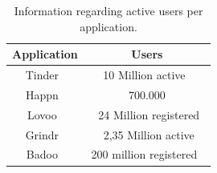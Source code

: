 \begin{table}[ht]
\centering
\caption{Information regarding active users per application.}
\def\arraystretch{2.0}
\begin{tabular}{| c | c |}
  \hline
    Application 				& Users  \\
  \hline
  \hline
    Tinder~\cite{tinder}		& 10 Million active~\cite{tinderusers} 	\\
    Happn~\cite{happn} 		& ~ 700.000 ~\cite{happnusers} 				\\
    Lovoo~\cite{lovoo} 		& ~ 24 Million registered~\cite{lovoousers}		\\
    Grindr~\cite{grindr} 		& ~ 2,35 Million active~\cite{grindrusers}\\
    Badoo~\cite{badoo}	 	& 200 million registered~\cite{badoousers}	\\
  \hline
\end{tabular}
\label{table:apps}
\end{table}

